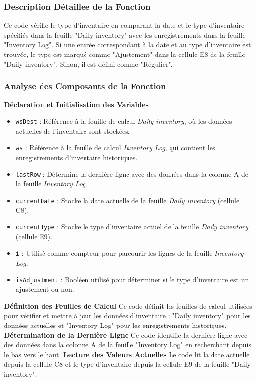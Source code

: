 \documentclass[a4paper, oneside, 12pt, final]{extreport}
\begin{document}
\subsubsection{Description Détaillee de la Fonction}
Ce code vérifie le type d'inventaire en comparant la date et le type d'inventaire spécifiés dans la feuille "Daily inventory" avec les enregistrements dans la feuille "Inventory Log". Si une entrée correspondant à la date et au type d'inventaire est trouvée, le type est marqué comme "Ajustement" dans la cellule E8 de la feuille "Daily inventory". Sinon, il est défini comme "Régulier".
\subsubsection{Analyse des Composants de la Fonction}

\textbf{Déclaration et Initialisation des Variables}

\begin{itemize}
    \item \texttt{wsDest} : Référence à la feuille de calcul \textit{Daily inventory}, où les données actuelles de l'inventaire sont stockées.
    \item \texttt{ws} : Référence à la feuille de calcul \textit{Inventory Log}, qui contient les enregistrements d'inventaire historiques.
    \item \texttt{lastRow} : Détermine la dernière ligne avec des données dans la colonne A de la feuille \textit{Inventory Log}.
    \item \texttt{currentDate} : Stocke la date actuelle de la feuille \textit{Daily inventory} (cellule C8).
    \item \texttt{currentType} : Stocke le type d'inventaire actuel de la feuille \textit{Daily inventory} (cellule E9).
    \item \texttt{i} : Utilisé comme compteur pour parcourir les lignes de la feuille \textit{Inventory Log}.
    \item \texttt{isAdjustment} : Booléen utilisé pour déterminer si le type d'inventaire est un ajustement ou non.
\end{itemize}

\textbf{Définition des Feuilles de Calcul}
Ce code définit les feuilles de calcul utilisées pour vérifier et mettre à jour les données d'inventaire : "Daily inventory" pour les données actuelles et "Inventory Log" pour les enregistrements historiques.
\textbf{Détermination de la Dernière Ligne}
Ce code identifie la dernière ligne avec des données dans la colonne A de la feuille "Inventory Log" en recherchant depuis le bas vers le haut.
\textbf{Lecture des Valeurs Actuelles}
Le code lit la date actuelle depuis la cellule C8 et le type d'inventaire depuis la cellule E9 de la feuille "Daily inventory".
\end{document}
